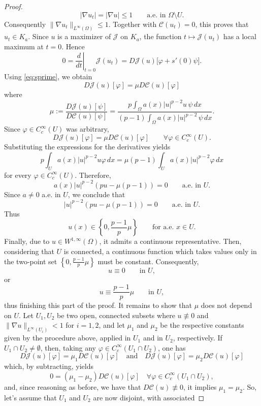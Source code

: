\documentclass[11pt,reqno]{amsart}
\theoremstyle{plain}
\theoremstyle{definition}
\numberwithin{equation}{section}
\begin{document}
\begin{proof}
$$
|\nabla u_t|=|\nabla u|\leq1
\qquad\text{a.e. in }\Omega\setminus U.
$$
Consequently $\|\nabla u_t\|_{L^\infty(\Omega)}\leq1$. Together with $\mathcal C(u_t)=0$, this proves that $u_t\in K_a$. Since $u$ is a maximizer of $\mathcal J$ on $K_a$, the function $t\longmapsto\mathcal J(u_t)$ has a local maximum at $t=0$. Hence
$$
0
=
\left.\frac{d}{dt}\right|_{t=0}
\mathcal J(u_t)
=
D\mathcal J(u)
\bigl[
\varphi+s'(0)\psi
\bigr].
$$
Using \eqref{eq:sprime}, we obtain
$$
D\mathcal J(u)[\varphi]
=
\mu
D\mathcal C(u)[\varphi] 
$$
where
\begin{equation} \label{eq:defmu}
\mu:=
\frac{
D\mathcal J(u)[\psi]
}{
D\mathcal C(u)[\psi]
} = \frac{p\int_\Omega a(x) |u|^{p-2}u \, \psi \,dx}{(p-1) \int_\Omega a(x) |u|^{p-2} \, \psi \, dx}.
\end{equation}
Since $\varphi\in C_c^\infty(U)$ was arbitrary,
$$
D\mathcal J(u)[\varphi]
=
\mu D\mathcal C(u)[\varphi]
\qquad
\forall\varphi\in C_c^\infty(U).
$$
Substituting the expressions for the derivatives yields
$$
p\int_U
a(x)|u|^{p-2}u\varphi\,dx
=
\mu(p-1)
\int_U
a(x)|u|^{p-2}\varphi\,dx
$$
for every $\varphi\in C_c^\infty(U)$. Therefore,
$$
a(x)|u|^{p-2}
\left(
pu-\mu(p-1)
\right)
=0
\qquad\text{a.e. in }U.
$$
Since $a\neq0$ a.e. in $U$, we conclude that
$$
|u|^{p-2}
\left(
pu-\mu(p-1)
\right)
=0
\qquad\text{a.e. in }U.
$$
Thus
$$
u(x)
\in
\left\{
0,\frac{p-1}{p}\mu
\right\}
\qquad\text{for a.e. }x\in U.
$$
Finally, due to $u\in W^{1,\infty}(\Omega)$, it admits a continuous representative. Then, considering that $U$ is connected, a continuous function which takes values only in the two-point set $\left\{
0,\frac{p-1}{p}\mu
\right\}
$ must be constant. Consequently,
$$
u\equiv0
\qquad\text{in }U,
$$
or
$$
u\equiv\frac{p-1}{p}\mu
\qquad\text{in }U,
$$
thus finishing this part of the proof. It remains to show that $\mu$ does not depend on $U$. Let $U_1, U_2$ be two open, connected subsets where  $u \not \equiv 0$ and $\|\nabla u\|_{L^\infty (U_i)} < 1$ for $i = 1, 2$, and let $\mu_1$ and $\mu_2$ be the respective constants given by the procedure above, applied in $U_1 $ and in $U_2$, respectively. If $U_1 \cap U_2 \not = \emptyset $, then, taking any $\varphi \in C_c^{\infty}(U_1 \cap U_2)$, one has
$$D \mathcal J (u) [\varphi] = \mu_1 D \mathcal{C}(u)[\varphi] \quad \text{and} \quad  D \mathcal J (u) [\varphi] = \mu_2 D \mathcal{C}(u)[\varphi]$$
which, by subtracting, yields
$$0 = (\mu_1 - \mu_2) D \mathcal{C}(u)[\varphi] \quad \forall \varphi \in C_c^{\infty}(U_1 \cap U_2),$$
and, since reasoning as before, we have that $D\mathcal C(u) \not \equiv 0$, it implies $\mu_1 = \mu_2$. So, let's assume that $U_1$ and $U_2$ are now disjoint, with associated

\end{proof}
\end{document}
